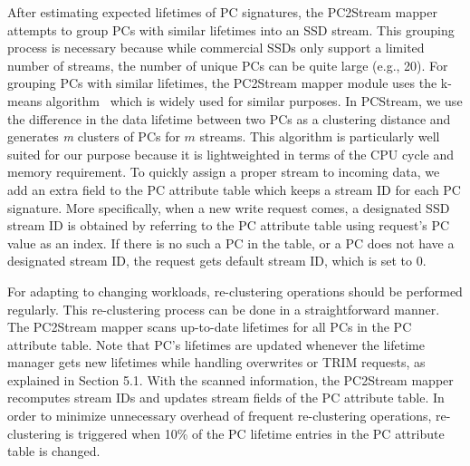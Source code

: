 After estimating expected lifetimes of PC signatures, the PC2Stream mapper 
attempts to group PCs with similar lifetimes into an SSD stream.  This grouping
process is necessary because while commercial SSDs only support a limited number
of streams, the number of unique PCs can be quite large (e.g., 20).  
For grouping PCs with similar lifetimes, the PC2Stream mapper module uses the k-means
algorithm~\cite{kmeans} which is widely used for similar purposes.  
In \textsf{\small PCStream}, we use the difference in the data lifetime between two PCs 
as a clustering distance and  generates {\it m} clusters of PCs for $m$ streams.
This algorithm is particularly well suited for our purpose because 
it is lightweighted in terms of the CPU cycle and memory requirement.
To quickly assign a proper stream to incoming data, we add an extra field to the
PC attribute table which keeps a stream ID for each PC signature.  More
specifically, when a new write request comes, a designated SSD stream ID is
obtained by referring to the PC attribute table using request's PC value as an
index.  If there is no such a PC in the table, or a PC does not have a
designated stream ID, the request gets default stream ID, which is set to 0.

For adapting to changing workloads, re-clustering operations should be
performed regularly. This re-clustering process can be done in a
straightforward manner. The PC2Stream mapper scans up-to-date lifetimes for
all PCs in the PC attribute table. Note that PC's lifetimes are updated whenever
the lifetime manager gets new lifetimes while handling overwrites or TRIM requests,
as explained in Section 5.1.  With the scanned information, the PC2Stream mapper
recomputes stream IDs and updates stream fields of the PC attribute table.
In order to minimize unnecessary overhead of frequent re-clustering operations, 
re-clustering is triggered when 10\% of the PC lifetime entries in the PC attribute
table is changed.


\vspace{-10pt}
